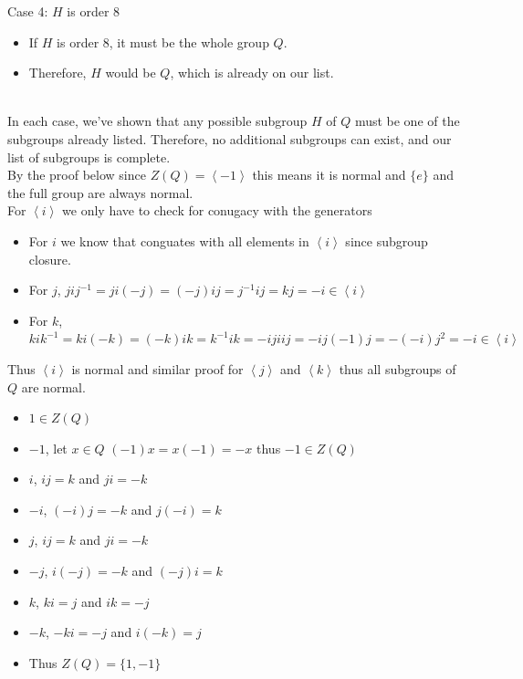\documentclass[12pt, letterpaper]{article}
\theoremstyle{definition}
\newcommand{\ang}[1]{\left\langle #1 \right\rangle}
\begin{document}
\begin{enumerate}[(a)]
Case 4: \(H\) is order 8
\begin{itemize}
    \item If \( H \) is order 8, it must be the whole group \( Q \).
    \item Therefore, \( H \) would be \( Q \), which is already on our list.
\end{itemize}
\phantom{text}\\
In each case, we've shown that any possible subgroup \( H \) of \( Q \) must be one of the subgroups already listed. Therefore, no additional subgroups can exist, and our list of subgroups is complete.\\
By the proof below since $Z(Q)=\ang{-1}$ this means it is normal and $\{e\}$ and the full group are always normal.\\
For $\ang{i}$ we only have to check for conugacy with the generators\\
\begin{itemize}
    \item For $i$ we know that conguates with all elements in $\ang{i}$ since subgroup closure.
    \item For $j$, $jij^{-1}=ji(-j)=(-j)ij=j^{-1}ij=kj=-i \in \ang{i}$
    \item For $k$, $kik^{-1}=ki(-k)=(-k)ik=k^{-1}ik=-ijiij=-ij(-1)j=-(-i)j^2=-i \in \ang{i}$
\end{itemize}
Thus $\ang{i}$ is normal and similar proof for $\ang{j}$ and $\ang{k}$ thus all subgroups of $Q$ are normal.
\begin{itemize}
    \item $1 \in Z(Q)$
    \item $-1$, let $x \in Q$
    $(-1)x=x(-1)=-x$ thus $-1 \in Z(Q)$
    \item $i$, $ij=k$ and $ji=-k$
    \item $-i$, $(-i)j=-k$ and $j(-i)=k$
    \item $j$, $ij=k$ and $ji=-k$
    \item $-j$, $i(-j)=-k$ and $(-j)i=k$
    \item $k$, $ki=j$ and $ik=-j$
    \item $-k$, $-ki=-j$ and $i(-k)=j$
    \item Thus $Z(Q)=\{1,-1\}$
\end{itemize}
\end{enumerate}

\newpage
\end{document}
